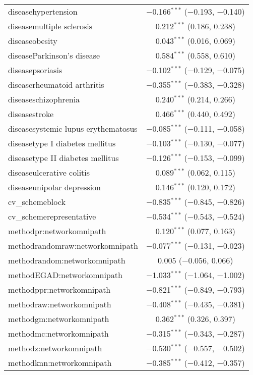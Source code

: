 \begin{table}[!htbp]
\begin{tabular}{@{\extracolsep{5pt}}lc}
  diseasehypertension & $-$0.166$^{***}$ ($-$0.193, $-$0.140) \\ 
  diseasemultiple sclerosis & 0.212$^{***}$ (0.186, 0.238) \\ 
  diseaseobesity & 0.043$^{***}$ (0.016, 0.069) \\ 
  diseaseParkinson's disease & 0.584$^{***}$ (0.558, 0.610) \\ 
  diseasepsoriasis & $-$0.102$^{***}$ ($-$0.129, $-$0.075) \\ 
  diseaserheumatoid arthritis & $-$0.355$^{***}$ ($-$0.383, $-$0.328) \\ 
  diseaseschizophrenia & 0.240$^{***}$ (0.214, 0.266) \\ 
  diseasestroke & 0.466$^{***}$ (0.440, 0.492) \\ 
  diseasesystemic lupus erythematosus & $-$0.085$^{***}$ ($-$0.111, $-$0.058) \\ 
  diseasetype I diabetes mellitus & $-$0.103$^{***}$ ($-$0.130, $-$0.077) \\ 
  diseasetype II diabetes mellitus & $-$0.126$^{***}$ ($-$0.153, $-$0.099) \\ 
  diseaseulcerative colitis & 0.089$^{***}$ (0.062, 0.115) \\ 
  diseaseunipolar depression & 0.146$^{***}$ (0.120, 0.172) \\ 
  cv\_schemeblock & $-$0.835$^{***}$ ($-$0.845, $-$0.826) \\ 
  cv\_schemerepresentative & $-$0.534$^{***}$ ($-$0.543, $-$0.524) \\ 
  methodpr:networkomnipath & 0.120$^{***}$ (0.077, 0.163) \\ 
  methodrandomraw:networkomnipath & $-$0.077$^{***}$ ($-$0.131, $-$0.023) \\ 
  methodrandom:networkomnipath & 0.005 ($-$0.056, 0.066) \\ 
  methodEGAD:networkomnipath & $-$1.033$^{***}$ ($-$1.064, $-$1.002) \\ 
  methodppr:networkomnipath & $-$0.821$^{***}$ ($-$0.849, $-$0.793) \\ 
  methodraw:networkomnipath & $-$0.408$^{***}$ ($-$0.435, $-$0.381) \\ 
  methodgm:networkomnipath & 0.362$^{***}$ (0.326, 0.397) \\ 
  methodmc:networkomnipath & $-$0.315$^{***}$ ($-$0.343, $-$0.287) \\ 
  methodz:networkomnipath & $-$0.530$^{***}$ ($-$0.557, $-$0.502) \\ 
  methodknn:networkomnipath & $-$0.385$^{***}$ ($-$0.412, $-$0.357) \\ 

\end{tabular}
\end{table}
